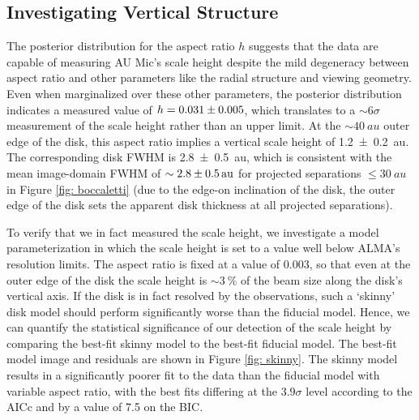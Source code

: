 \documentclass[modern]{aastex62}
\begin{document}
\subsection{Investigating Vertical Structure}
\label{subsection: vertical analysis}

The posterior distribution for the aspect ratio $h$ suggests that the data are capable of measuring AU Mic's scale height despite the mild degeneracy between aspect ratio and other parameters like the radial structure and viewing geometry.  
Even when marginalized over these other parameters, the posterior distribution indicates a measured value of $h=\num{0.031 \pm 0.005}$, which translates to a $\sim 6 \sigma$ measurement of the scale height rather than an upper limit.
At the $\sim \SI{40}{au}$ outer edge of the disk, this aspect ratio implies a vertical scale height of \SI{1.2 \pm 0.2}{au}. 
The corresponding disk FWHM is \SI{2.8 \pm 0.5}{au}, which is consistent with the mean image-domain FWHM of $\sim \SI{2.8 \pm 0.5}{au}$ for projected separations $\leq \SI{30}{au}$  in Figure \ref{fig: boccaletti}
(due to the edge-on inclination of the disk, the outer edge of the disk sets the apparent disk thickness at all projected separations).

To verify that we in fact measured the scale height, we investigate a model parameterization in which the scale height is set to a value well below ALMA's resolution limits.
The aspect ratio is fixed at a value of $0.003$, so that even at the outer edge of the disk the scale height is $\sim \SI{3}{\percent}$ of the beam size along the disk's vertical axis.
If the disk is in fact resolved by the observations, such a `skinny' disk model should perform significantly worse than the fiducial model.
Hence, we can quantify the statistical significance of our detection of the scale height by comparing the best-fit skinny model to the best-fit fiducial model.
The best-fit model image and residuals are shown in Figure \ref{fig: skinny}.
The skinny model results in a significantly poorer fit to the data than the fiducial model with variable aspect ratio, with the best fits differing at the $3.9 \sigma$ level according to the AICc and by a value of 7.5 on the BIC.
\end{document}

